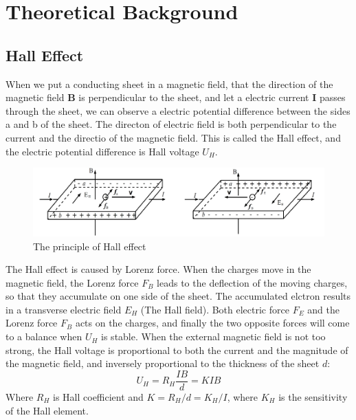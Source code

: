 \documentclass[12pt, a4paper]{article}
\begin{document}
\section{Theoretical Background}
\subsection{Hall Effect}
When we put a conducting sheet in a magnetic field, that the direction of the magnetic field \textbf{B} is perpendicular to the sheet, and 
let a electric current \textbf{I} passes through the sheet, we can observe a electric potential difference between the 
sides a and b of the sheet. The directon of electric field is both perpendicular to the current and the directio of the magnetic field. 
This is called the Hall effect, and the electric potential difference is Hall voltage $U_H$.
\begin{figure}[H]
	\centering
	\includegraphics[scale = 0.6]{p1.png}
	\caption{The principle of Hall effect}	
\end{figure}

The Hall effect is caused by Lorenz force. When the charges move in the magnetic field, the Lorenz force $F_B$ leads to the deflection of 
the moving charges, so that they accumulate on one side of the sheet. The accumulated elctron results in a transverse electric field $E_H$ 
(The Hall field). Both electric force $F_E$ and the Lorenz force $F_B$ acts on the charges, and finally the two opposite forces will come to 
a balance when $U_H$  is stable. When the external magnetic field is not too strong, the Hall voltage is proportional to both the current and 
the magnitude of the magnetic field, and inversely proportional to the thickness of the sheet $d$:
\begin{equation}
	U_H = R_H \frac{IB}{d} = KIB
\end{equation}
Where $R_H$ is Hall coefficient and $K = R_H/d = K_H/I$, where $K_H$ is the sensitivity of the Hall element.
\end{document}
